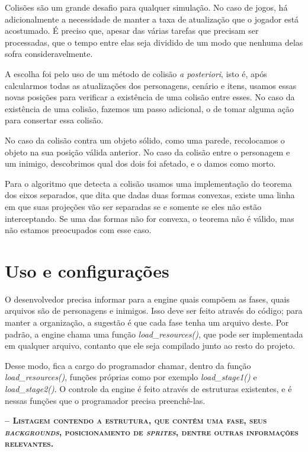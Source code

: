 \documentclass[brazil]{abnt}
\begin{document}
Colisões são um grande desafio para qualquer simulação. No caso de jogos, há adicionalmente a necessidade de manter a taxa de atualização que o jogador está acostumado. É preciso que, apesar das várias tarefas que precisam ser processadas, que o tempo entre elas seja dividido de um modo que nenhuma delas sofra consideravelmente.

A escolha foi pelo uso de um método de colisão \textit{a posteriori}, isto é, após calcularmos todas as atualizações dos personagens, cenário e itens, usamos essas novas posições para verificar a existência de uma colisão entre esses. No caso da existência de uma colisão, fazemos um passo adicional, o de tomar alguma ação para consertar essa colisão.

No caso da colisão contra um objeto sólido, como uma parede, recolocamos o objeto na sua posição válida anterior. No caso da colisão entre o personagem e um inimigo, descobrimos qual dos dois foi afetado, e o damos como morto.

Para o algoritmo que detecta a colisão usamos uma implementação do teorema dos eixos separados, que dita que dadas duas formas convexas, existe uma linha em que suas projeções vão ser separadas se e somente se eles não estão interceptando. Se uma das formas não for convexa, o teorema não é válido, mas não estamos preocupados com esse caso.

\section{Uso e configurações}

O desenvolvedor precisa informar para a engine quais compõem as fases, quais arquivos são de personagens e inimigos. Isso deve ser feito através do código; para manter a organização, a sugestão é que cada fase tenha um arquivo deste. Por padrão, a engine chama uma função \textit{load\_resources()}, que pode ser implementada em qualquer arquivo, contanto que ele seja compilado junto ao resto do projeto.

Desse modo, fica a cargo do programador chamar, dentro da função \textit{load\_resources()}, funções próprias como por exemplo \textit{load\_stage1()} e \textit{load\_stage2()}. O controle da engine é feito através de estruturas existentes, e é nessas funções que o programador precisa preenchê-las.

\textsc{\textbf{-- Listagem contendo a estrutura, que contém uma fase, seus \textit{backgrounds}, posicionamento de \textit{sprites}, dentre outras informações relevantes.}}
\end{document}
